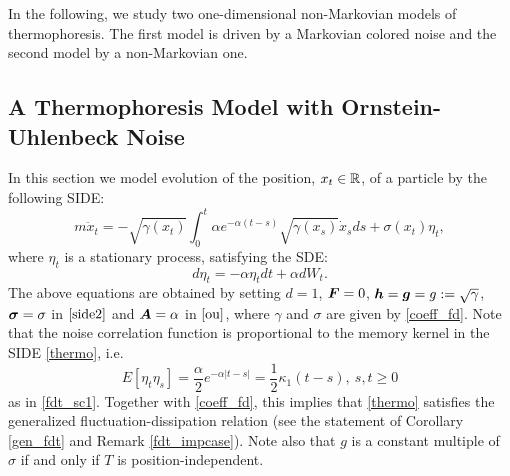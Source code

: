 
In the following, we study two one-dimensional non-Markovian models of thermophoresis. The first model is driven by a Markovian colored noise and the second model by a non-Markovian one.

\subsection{A Thermophoresis Model with Ornstein-Uhlenbeck Noise}
In this section we model evolution of the position, $x_{t} \in \mathbb{R}$, of a particle by the following SIDE: 
\begin{equation} \label{thermo}
m \ddot{x}_{t} =  - \sqrt{\gamma(x_{t})} \int_{0}^{t} \alpha e^{-\alpha(t-s)} \sqrt{\gamma(x_{s})} \dot{x}_{s} ds +  \sigma(x_{t}) \eta_{t},
\end{equation}
where $\eta_{t}$ is a stationary process, satisfying the SDE:
\begin{equation} \label{outhermo}
d\eta_{t} = -\alpha \eta_{t} dt + \alpha dW_{t}.
\end{equation}
The above equations are obtained by setting $d=1$, $\boldsymbol{F} = 0$, $\boldsymbol{h} = \boldsymbol{g} = g := \sqrt{\gamma}$, $\boldsymbol{\sigma} = \sigma$ in $\eqref{side2}$ and $\boldsymbol{A} = \alpha$ in $\eqref{ou}$, where $\gamma$ and $\sigma$ are given by \eqref{coeff_fd}. Note that the noise correlation function is proportional to the memory kernel in the SIDE \eqref{thermo}, i.e. 
\begin{equation} E[\eta_{t} \eta_{s}] = \frac{\alpha}{2} e^{-\alpha|t-s|} = \frac{1}{2}\kappa_{1}(t-s), \ s,t \geq 0\end{equation} 
as in \eqref{fdt_sc1}. Together with  \eqref{coeff_fd}, this implies that \eqref{thermo} satisfies the generalized fluctuation-dissipation relation (see the statement of Corollary \ref{gen_fdt} and Remark \ref{fdt_impcase}).  Note also that $g$ is a constant multiple of $\sigma$ if and only if $T$ is position-independent. 


